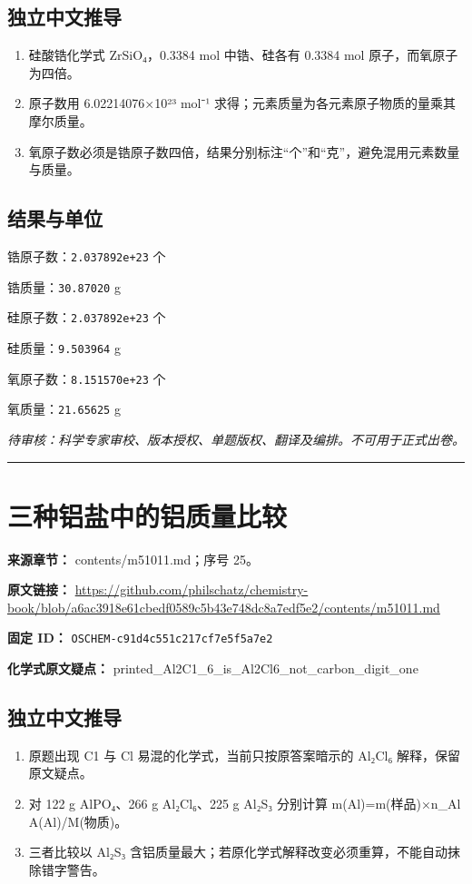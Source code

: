 \documentclass[UTF8,11pt,oneside,openany,fontset=none]{ctexbook}
\begin{document}
\subsection*{独立中文推导}
\begin{enumerate}
\item 硅酸锆化学式 ZrSiO₄，0.3384 mol 中锆、硅各有 0.3384 mol 原子，而氧原子为四倍。
\item 原子数用 6.02214076×10²³ mol⁻¹ 求得；元素质量为各元素原子物质的量乘其摩尔质量。
\item 氧原子数必须是锆原子数四倍，结果分别标注“个”和“克”，避免混用元素数量与质量。
\end{enumerate}
\subsection*{结果与单位}
\noindent 锆原子数：\texttt{2.037892e+23} 个\par
\noindent 锆质量：\texttt{30.87020} g\par
\noindent 硅原子数：\texttt{2.037892e+23} 个\par
\noindent 硅质量：\texttt{9.503964} g\par
\noindent 氧原子数：\texttt{8.151570e+23} 个\par
\noindent 氧质量：\texttt{21.65625} g\par
\noindent\textit{待审核：科学专家审校、版本授权、单题版权、翻译及编排。不可用于正式出卷。}
\medskip\hrule\medskip
\section{三种铝盐中的铝质量比较}
\noindent\textbf{来源章节：} contents/m51011.md；序号 25。\par
\noindent\textbf{原文链接：} \url{https://github.com/philschatz/chemistry-book/blob/a6ac3918e61cbedf0589c5b43e748dc8a7edf5e2/contents/m51011.md}\par
\noindent\textbf{固定 ID：} \texttt{OSCHEM-c91d4c551c217cf7e5f5a7e2}\par
\textbf{化学式原文疑点：} printed\_Al2C1\_6\_is\_Al2Cl6\_not\_carbon\_digit\_one\par
\subsection*{独立中文推导}
\begin{enumerate}
\item 原题出现 C1 与 Cl 易混的化学式，当前只按原答案暗示的 Al₂Cl₆ 解释，保留原文疑点。
\item 对 122 g AlPO₄、266 g Al₂Cl₆、225 g Al₂S₃ 分别计算 m(Al)=m(样品)×n\_Al A(Al)/M(物质)。
\item 三者比较以 Al₂S₃ 含铝质量最大；若原化学式解释改变必须重算，不能自动抹除错字警告。
\end{enumerate}
\end{document}
